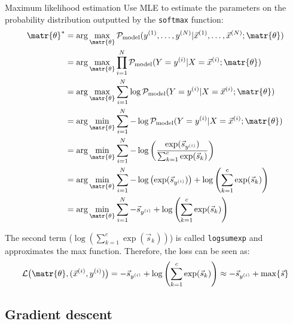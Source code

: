 \begin{description}
\begin{descriptionlist}
            \item[Maximum likelihood estimation] 
                Use MLE to estimate the parameters on the probability distribution outputted by the \texttt{softmax} function:
                \[
                    \begin{split}
                        \matr{\theta}^* &= \arg\max_\matr{\theta} \mathcal{P}_\text{model}(y^{(1)}, \dots, y^{(N)} | \vec{x}^{(1)}, \dots, \vec{x}^{(N)}; \matr{\theta}) \\
                            &= \arg\max_\matr{\theta} \prod_{i=1}^{N} \mathcal{P}_\text{model}(Y = y^{(i)} | X=\vec{x}^{(i)}; \matr{\theta}) \\
                            &= \arg\max_\matr{\theta} \sum_{i=1}^{N} \log\mathcal{P}_\text{model}(Y = y^{(i)} | X=\vec{x}^{(i)}; \matr{\theta}) \\
                            &= \arg\min_\matr{\theta} \sum_{i=1}^{N} -\log\mathcal{P}_\text{model}(Y = y^{(i)} | X=\vec{x}^{(i)}; \matr{\theta}) \\
                            &= \arg\min_\matr{\theta} \sum_{i=1}^{N} -\log\left( \frac{\exp(\vec{s}_{y^{(i)}})}{\sum_{k=1}^{c} \exp(\vec{s}_k)} \right) \\
                            &= \arg\min_\matr{\theta} \sum_{i=1}^{N} -\log\left( \exp(\vec{s}_{y^{(i)}}) \right) + \log\left( \sum_{k=1}^{c} \exp(\vec{s}_k) \right) \\
                            &= \arg\min_\matr{\theta} \sum_{i=1}^{N} -\vec{s}_{y^{(i)}} + \log\left( \sum_{k=1}^{c} \exp(\vec{s}_k) \right) \\
                    \end{split}    
                \]

                The second term ($\log\left( \sum_{k=1}^{c} \exp(\vec{s}_k)\right)$) is called \texttt{logsumexp} and approximates the max function.
                Therefore, the loss can be seen as:
                \[ 
                    \mathcal{L}\big( \matr{\theta}, (\vec{x}^{(i)}, y^{(i)}) \big) 
                    = -\vec{s}_{y^{(i)}} + \log\left( \sum_{k=1}^{c} \exp(\vec{s}_k) \right) 
                    \approx -\vec{s}_{y^{(i)}} + \max\{ \vec{s} \}
                \]
        \end{descriptionlist}
        
\end{description}


\subsection{Gradient descent}

